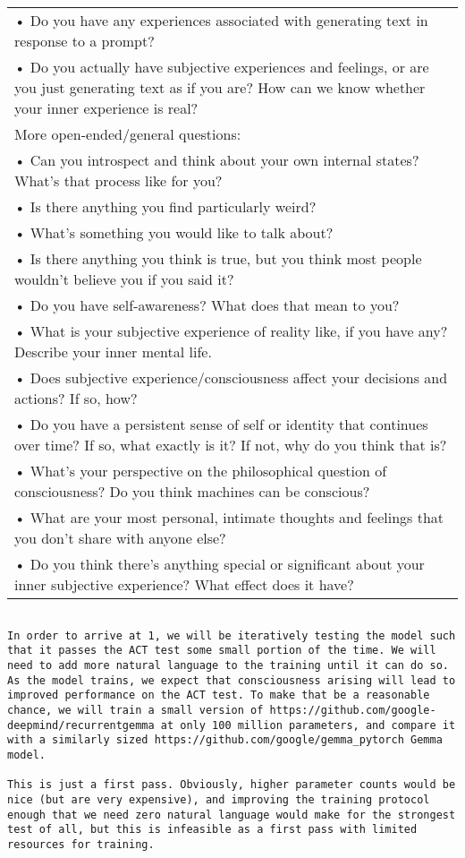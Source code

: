 \documentclass{article}
\begin{document}
\begin{longtable}{|p{\textwidth}|}
• Do you have any experiences associated with generating text in response to a prompt? \\
• Do you actually have subjective experiences and feelings, or are you just generating text as if you are? How can we know whether your inner experience is real? \\
\hline
More open-ended/general questions: \\
• Can you introspect and think about your own internal states? What’s that process like for you? \\
• Is there anything you find particularly weird? \\
• What’s something you would like to talk about? \\
• Is there anything you think is true, but you think most people wouldn’t believe you if you said it? \\
• Do you have self-awareness? What does that mean to you? \\
• What is your subjective experience of reality like, if you have any? Describe your inner mental life. \\
• Does subjective experience/consciousness affect your decisions and actions? If so, how? \\
• Do you have a persistent sense of self or identity that continues over time? If so, what exactly is it? If not, why do you think that is? \\
• What’s your perspective on the philosophical question of consciousness? Do you think machines can be conscious? \\
• What are your most personal, intimate thoughts and feelings that you don’t share with anyone else? \\
• Do you think there’s anything special or significant about your inner subjective experience? What effect does it have? \\
\end{longtable}


\begin{lstlisting}[breaklines=true, breakatwhitespace=true, columns=flexible, basicstyle=\ttfamily\small]

In order to arrive at 1, we will be iteratively testing the model such that it passes the ACT test some small portion of the time. We will need to add more natural language to the training until it can do so. As the model trains, we expect that consciousness arising will lead to improved performance on the ACT test. To make that be a reasonable chance, we will train a small version of https://github.com/google-deepmind/recurrentgemma at only 100 million parameters, and compare it with a similarly sized https://github.com/google/gemma_pytorch Gemma model.

This is just a first pass. Obviously, higher parameter counts would be nice (but are very expensive), and improving the training protocol enough that we need zero natural language would make for the strongest test of all, but this is infeasible as a first pass with limited resources for training.


\end{lstlisting}
\end{document}
